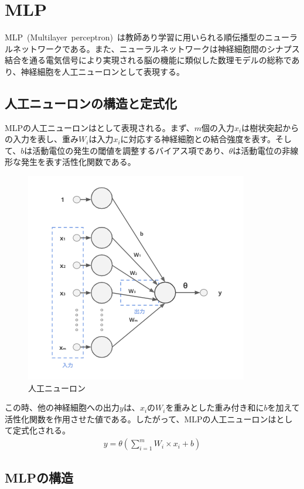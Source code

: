 \section{MLP}

MLP~(Multilayer~perceptron)~は教師あり学習に用いられる順伝播型のニューラルネットワークである。また、ニューラルネットワークは神経細胞間のシナプス結合を通る電気信号により実現される脳の機能に類似した数理モデルの総称であり、神経細胞を人工ニューロンとして表現する。

\subsection{人工ニューロンの構造と定式化}

MLPの人工ニューロンはとして表現される。まず、$m$個の入力$x_i$は樹状突起からの入力を表し、重み$W_i$は入力$x_i$に対応する神経細胞との結合強度を表す。そして、$b$は活動電位の発生の閾値を調整するバイアス項であり、$\theta$は活動電位の非線形な発生を表す活性化関数である。

\clearpage

\begin{figure}[t]
\centering
\includegraphics[width=0.5\columnwidth]{figure/neuron.png}
\caption[MLPの人工ニューロン]{人工ニューロン}
\label{fig:neuron}
\end{figure}

この時、他の神経細胞への出力$y$は、$x_i$の$W_i$を重みとした重み付き和に$b$を加えて活性化関数を作用させた値である。したがって、MLPの人工ニューロンはとして定式化される。
\begin{align}
    \label{eq:MLP0_0}
    y=\theta(\sum_{i=1}^{m} W_{i} \times x_i+b)
\end{align}

\subsection{MLPの構造}


